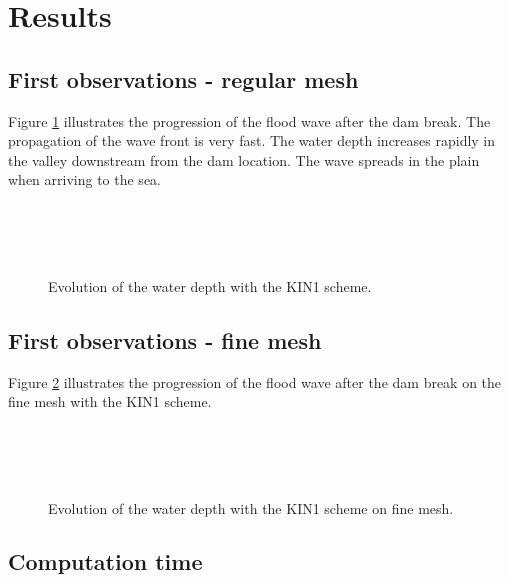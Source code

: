 \section{Results}
\subsection{First observations - regular mesh}

Figure \ref{fig:malpasset:WD_cin1} illustrates the progression of the flood
wave after the dam break.
The propagation of the wave front is very fast.
The water depth increases rapidly in the valley downstream from the dam location.
The wave spreads in the plain when arriving to the sea.

\begin{figure}[H]
  \centering
  \\
  \\
  \\
  \caption{Evolution of the water depth with the KIN1 scheme.}
  \label{fig:malpasset:WD_cin1}
\end{figure}

\subsection{First observations - fine mesh}

Figure \ref{fig:malpasset:WD_fine} illustrates the progression of the flood
wave after the dam break on the fine mesh with the KIN1 scheme.
\begin{figure}[H]
  \centering
  \\
  \\
  \\
  \caption{Evolution of the water depth with the KIN1 scheme on fine mesh.}
  \label{fig:malpasset:WD_fine}
\end{figure}

\subsection{Computation time}


